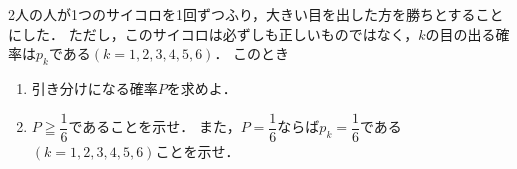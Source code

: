 \documentclass[../../main.tex]{subfiles}
\begin{document}
2人の人が1つのサイコロを1回ずつふり，大きい目を出した方を勝ちとすることにした．
ただし，このサイコロは必ずしも正しいものではなく，$k$の目の出る確率は$p_k$である$(k=1,2,3,4,5,6)$．
このとき
\begin{enumerate}
  \item 引き分けになる確率$P$を求めよ．
  \item $\displaystyle P\geqq\dfrac{1}{6}$であることを示せ．
    また，$\displaystyle P=\dfrac{1}{6}$ならば$\displaystyle p_k=\dfrac{1}{6}$である$(k=1,2,3,4,5,6)$ことを示せ．
\end{enumerate}
\end{document}
